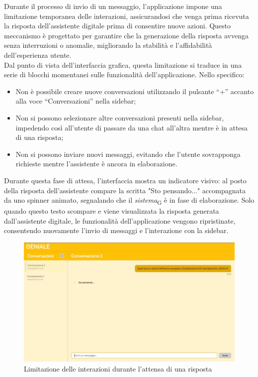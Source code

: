 Durante il processo di invio di un messaggio, l’applicazione impone una limitazione temporanea delle interazioni, assicurandosi che venga prima ricevuta la risposta dell’assistente digitale prima di consentire nuove azioni. Questo meccanismo è progettato per garantire che la generazione della risposta avvenga senza interruzioni o anomalie, migliorando la stabilità e l’affidabilità dell’esperienza utente. \\
Dal punto di vista dell’interfaccia grafica, questa limitazione si traduce in una serie di blocchi momentanei sulle funzionalità dell’applicazione. Nello specifico:
\begin{itemize}
    \item Non è possibile creare nuove conversazioni utilizzando il pulsante “+” accanto alla voce “Conversazioni” nella sidebar;
    \item Non si possono selezionare altre conversazioni presenti nella sidebar, impedendo così all’utente di passare da una chat all’altra mentre è in attesa di una risposta;
    \item Non si possono inviare nuovi messaggi, evitando che l’utente sovrapponga richieste mentre l’assistente è ancora in elaborazione.
\end{itemize}
Durante questa fase di attesa, l’interfaccia mostra un indicatore visivo: al posto della risposta dell’assistente compare la scritta "Sto pensando..." accompagnata da uno spinner animato, segnalando che il \textit{sistema}\textsubscript{G} è in fase di elaborazione. Solo quando questo testo scompare e viene visualizzata la risposta generata dall’assistente digitale, le funzionalità dell’applicazione vengono ripristinate, consentendo nuovamente l’invio di messaggi e l’interazione con la sidebar.
\begin{figure}[H]
\centering
\includegraphics[width=1\textwidth]{contents/img/lock_pc.jpg}
\caption{Limitazione delle interazioni durante l'attensa di una risposta}
\end{figure}

